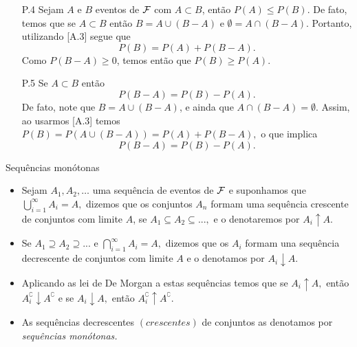 \begin{frame}
\begin{enumerate}
\item[P.4] Sejam  $A$ e $B$ eventos de ${\cal F}$ com $A  \subset  B$, então $P(A) \leq P(B).$ De fato, temos que se $ A\subset B $ então $ B = A\cup (B - A) $ e  $ \emptyset = A\cap (B - A) .$  Portanto, utilizando [A.3] segue que 
\[P(B)=P(A)+P(B- A).\] 	 
Como $ P(B - A)\geq 0 $, temos então que $ P(B)\geq P(A).$

\item[P.5] Se $ A\subset B$ então  $$P(B- A)=P(B)-P(A).$$ De fato, note que $ B=A\cup (B- A) $, e ainda que $ A\cap (B - A)=\emptyset $. Assim, ao usarmos [A.3] temos $P(B)=P(A\cup (B- A))=P(A)+P(B- A),$ o que implica $$P(B- A)=P(B)-P(A).$$ 	
\end{enumerate}
\begin{block}{Sequências monótonas}
 \begin{itemize}
\item Sejam  $A_1, A_2, \ldots$ uma sequência de eventos de
${\cal F}$ e suponhamos que $\bigcup _{i=1}^{\infty }A_i=A,$ dizemos que os
conjuntos $A_{n}$ formam uma sequência crescente de conjuntos com limite $A$, se
$A_{1}\subseteq A_{2}\subseteq
...,$  e  o denotaremos por $A_{i}\uparrow A.$ 

\item Se $A_{1}\supseteq
A_{2}\supseteq ...$ e $\bigcap _{i=1}^{\infty }A_{i}=A,$ dizemos que os $A_{i}$
formam una sequência decrescente de conjuntos com limite $A$ e o
denotamos por $A_{i}\downarrow A.$ 

\item Aplicando as lei de De Morgan a estas
sequências temos que se $A_{i}\uparrow A,$ então $A_{i}^\complement\downarrow
A^\complement$ e se $A_{i}\downarrow A,$ então $A_{i}^\complement\uparrow A^\complement $. 

\item As sequências
decrescentes $\left( crescentes\right) $ de conjuntos as denotamos por
{\it sequências monótonas.}

 \end{itemize}
 \end{block}
\end{frame}

